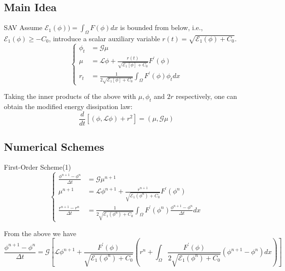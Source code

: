 \documentclass[9pt]{beamer}
\begin{document}
\subsection{Main Idea}

\begin{frame}{SAV}
Assume $\mathcal E_1(\phi)) = \int_{\Omega} F(\phi)dx$ is bounded from below, i.e., $\mathcal E_1(\phi) \geq -C_0$, introduce a scalar auxiliary variable $r(t) = \sqrt{\mathcal E_1(\phi) + C_0}$.
$$\left\{
\begin{aligned} \phi_t &=\mathcal G \mu \\ 
\mu &=\mathcal L \phi+\frac{r(t)}{\sqrt{\mathcal E_{1}[\phi]+C_{0}}} F^{\prime}(\phi) \\ 
r_t &=\frac{1}{2 \sqrt{\mathcal E_{1}[\phi]+C_{0}}} \int_{\Omega} F^{\prime}(\phi) \phi_{t} d x 
\end{aligned}
\right.$$

Taking the inner products of the above with $\mu, \phi_t$ and $2r$ respectively, one can obtain the modified energy dissipation law:
$$
\frac{d}{d t}\left[(\phi, \mathcal{L} \phi)+r^{2}\right]=(\mu, \mathcal{G} \mu)
$$
\end{frame}

\subsection{Numerical Schemes}

\begin{frame}{First-Order Scheme(1)}
$$\left\{
\begin{aligned}
\frac{\phi^{n+1}-\phi^{n}}{\Delta t} &=\mathcal{G} \mu^{n+1} \\
\mu^{n+1} &=\mathcal{L} \phi^{n+1}+\frac{r^{n+1}}{\sqrt{\mathcal{E}_{1}(\phi^{n})+C_0}} F^{\prime}(\phi^n)\\
\frac{r^{n+1}-r^{n}}{\Delta t} &=\frac{1}{2 \sqrt{\mathcal{E}_{1}(\phi^{n})+C_0}} \int_{\Omega} F^{\prime}(\phi^n)\frac{\phi^{n+1}-\phi^{n}}{\Delta t} dx
\end{aligned}
\right.$$

From the above we have
$$
\frac{\phi^{n+1}-\phi^{n}}{\Delta t}=\mathcal{G}\left[\mathcal{L} \phi^{n+1}+\frac{F^{\prime}(\phi)}{\sqrt{\mathcal{E}_{1}(\phi^{n})+C_0}}\left(r^{n}+\int_{\Omega} \frac{F^{\prime}(\phi)}{2 \sqrt{\mathcal{E}_{1}(\phi^{n})+C_0}}\left(\phi^{n+1}-\phi^{n}\right) dx \right)\right]
$$
\end{frame}
\end{document}
